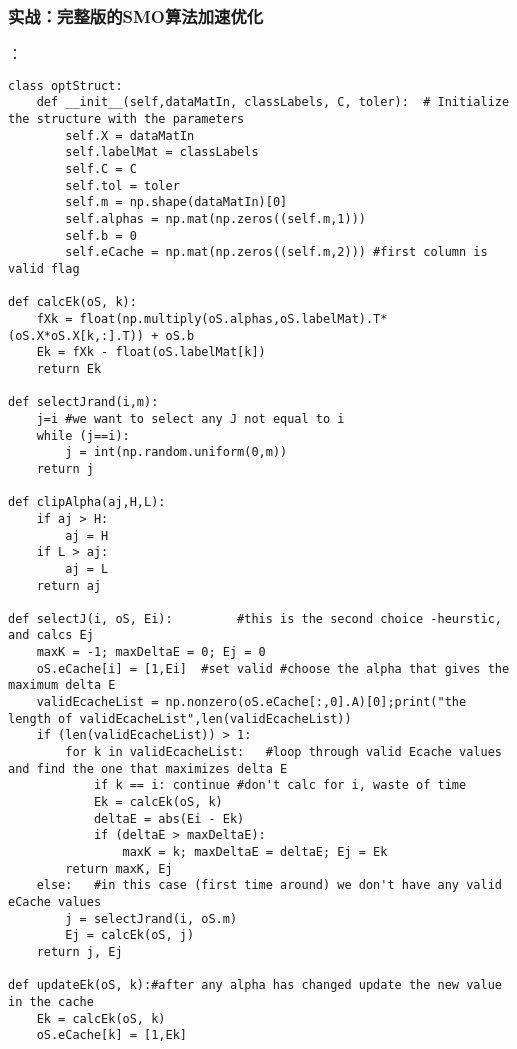 \subsubsection{实战：完整版的SMO算法加速优化}
：
\begin{lstlisting}
class optStruct:
    def __init__(self,dataMatIn, classLabels, C, toler):  # Initialize the structure with the parameters
        self.X = dataMatIn
        self.labelMat = classLabels
        self.C = C
        self.tol = toler
        self.m = np.shape(dataMatIn)[0]
        self.alphas = np.mat(np.zeros((self.m,1)))
        self.b = 0
        self.eCache = np.mat(np.zeros((self.m,2))) #first column is valid flag

def calcEk(oS, k):
    fXk = float(np.multiply(oS.alphas,oS.labelMat).T*(oS.X*oS.X[k,:].T)) + oS.b
    Ek = fXk - float(oS.labelMat[k])
    return Ek

def selectJrand(i,m):
    j=i #we want to select any J not equal to i
    while (j==i):
        j = int(np.random.uniform(0,m))
    return j

def clipAlpha(aj,H,L):
    if aj > H:
        aj = H
    if L > aj:
        aj = L
    return aj

def selectJ(i, oS, Ei):         #this is the second choice -heurstic, and calcs Ej
    maxK = -1; maxDeltaE = 0; Ej = 0
    oS.eCache[i] = [1,Ei]  #set valid #choose the alpha that gives the maximum delta E
    validEcacheList = np.nonzero(oS.eCache[:,0].A)[0];print("the length of validEcacheList",len(validEcacheList))
    if (len(validEcacheList)) > 1:
        for k in validEcacheList:   #loop through valid Ecache values and find the one that maximizes delta E
            if k == i: continue #don't calc for i, waste of time
            Ek = calcEk(oS, k)
            deltaE = abs(Ei - Ek)
            if (deltaE > maxDeltaE):
                maxK = k; maxDeltaE = deltaE; Ej = Ek
        return maxK, Ej
    else:   #in this case (first time around) we don't have any valid eCache values
        j = selectJrand(i, oS.m)
        Ej = calcEk(oS, j)
    return j, Ej

def updateEk(oS, k):#after any alpha has changed update the new value in the cache
    Ek = calcEk(oS, k)
    oS.eCache[k] = [1,Ek]


\end{lstlisting}
